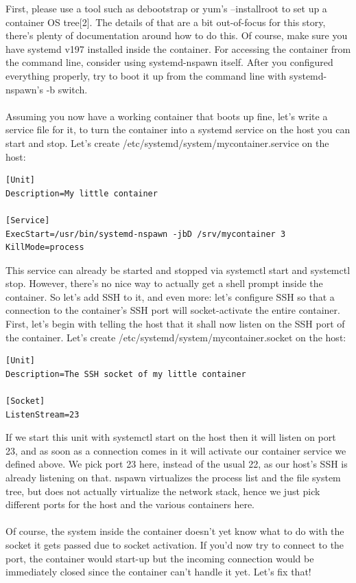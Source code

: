 \documentclass[titlepage]{article}
\begin{document}
First, please use a tool such as debootstrap or yum's --installroot to set up a container OS tree[2]. The details of that are a bit out-of-focus for this story, there's plenty of documentation around how to do this. Of course, make sure you have systemd v197 installed inside the container. For accessing the container from the command line, consider using systemd-nspawn itself. After you configured everything properly, try to boot it up from the command line with systemd-nspawn's -b switch.
\\
\\
Assuming you now have a working container that boots up fine, let's write a service file for it, to turn the container into a systemd service on the host you can start and stop. Let's create /etc/systemd/system/mycontainer.service on the host:
\begin{lstlisting}
[Unit]
Description=My little container

[Service]
ExecStart=/usr/bin/systemd-nspawn -jbD /srv/mycontainer 3
KillMode=process
\end{lstlisting}
This service can already be started and stopped via systemctl start and systemctl stop. However, there's no nice way to actually get a shell prompt inside the container. So let's add SSH to it, and even more: let's configure SSH so that a connection to the container's SSH port will socket-activate the entire container. First, let's begin with telling the host that it shall now listen on the SSH port of the container. Let's create /etc/systemd/system/mycontainer.socket on the host:
\begin{lstlisting}
[Unit]
Description=The SSH socket of my little container

[Socket]
ListenStream=23
\end{lstlisting}
If we start this unit with systemctl start on the host then it will listen on port 23, and as soon as a connection comes in it will activate our container service we defined above. We pick port 23 here, instead of the usual 22, as our host's SSH is already listening on that. nspawn virtualizes the process list and the file system tree, but does not actually virtualize the network stack, hence we just pick different ports for the host and the various containers here.
\\
\\
Of course, the system inside the container doesn't yet know what to do with the socket it gets passed due to socket activation. If you'd now try to connect to the port, the container would start-up but the incoming connection would be immediately closed since the container can't handle it yet. Let's fix that!
\end{document}
